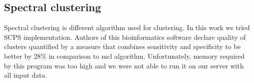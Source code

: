 \subsection{Spectral clustering}
Spectral clustering is different algorithm used for clustering.
In this work we tried SCPS implementation\cite{scps}.
Authors of this bioinformatics software declare quality of clusters quantified by a measure that combines sensitivity and specificity to be better by 28\% in comparison to mcl algorithm.
Unfortunately, memory required by this program was too high and we were not able to run it on our server with all input data. 

